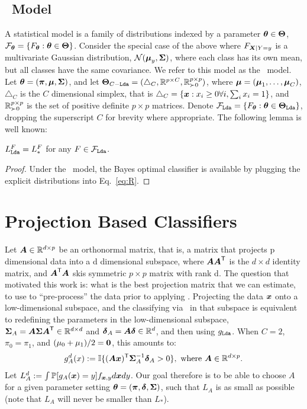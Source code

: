 \documentclass[10pt]{article}
\begin{document}
\subsection{\Lda~Model}

A statistical model is  a family of distributions indexed by a parameter $\boldsymbol{\theta} \in \boldsymbol{\Theta}$, $\mathcal{F}_{\boldsymbol{\theta}}=\{F_{\boldsymbol{\theta}} : \boldsymbol{\theta} \in \boldsymbol{\Theta} \}$.
Consider the special case of the above where $F_{\boldsymbol{X}|Y=y}$ is a multivariate Gaussian distribution,
$\mathcal{N}(\boldsymbol{\mu}_y,\boldsymbol{\Sigma})$, where each class has its own mean, but all classes have the same covariance.
We refer to this model as the \Lda~model.
Let $\boldsymbol{\theta}=(\boldsymbol{\pi},\boldsymbol{\mu},\boldsymbol{\Sigma})$, and let $\boldsymbol{\Theta}_{C-{\sc \texttt{Lda}}}=( \triangle_C, \mathbb{R}^{p \times C},\mathbb{R}_{\succ 0}^{p \times p})$, where $\boldsymbol{\mu}=(\boldsymbol{\mu}_1,\ldots, \boldsymbol{\mu}_C)$, $\triangle_C$ is the $C$ dimensional simplex, that is $\triangle_C = \{ \boldsymbol{x} : x_i \geq 0 \forall i, \sum_i x_i = 1\}$, and $\mathbb{R}_{\succ 0}^{p \times p}$ is the set of positive definite  $p \times p$ matrices. Denote
$\mathcal{F}_{{\sc \texttt{Lda}}}=\{F_{\boldsymbol{\theta}} : \boldsymbol{\theta} \in \boldsymbol{\Theta}_{{\sc \texttt{Lda}}}\}$, dropping the superscript $C$ for brevity where appropriate.
The following lemma is well known:
\begin{lem}
$L_{{\sc \texttt{Lda}}}^F=L_*^F$ for any $F \in \mathcal{F}_{{\sc \texttt{Lda}}}$.
\end{lem}

\begin{proof}
Under the \Lda~model, the Bayes optimal classifier is available by plugging the explicit distributions into Eq.~\eqref{eq:R}.
\end{proof}




\section[projections]{Projection Based Classifiers}


Let $\boldsymbol{A} \in \mathbb{R}^{d \times p}$ be an orthonormal matrix, that is, a matrix that projects p dimensional data into a d dimensional subspace, where $\boldsymbol{A}\boldsymbol{A}^{\mathsf{T}}$ is the $d \times d$ identity matrix, and $\boldsymbol{A}^{\mathsf{T}} \boldsymbol{A}$ skis symmetric $p \times p$ matrix with rank d.   The question that motivated this work is: what is the best projection matrix that we can estimate, to use to ``pre-process'' the data prior to applying \Lda.
Projecting the data $\boldsymbol{x}$ onto a low-dimensional subspace, and the classifying via \Lda~in that subspace is equivalent to redefining the parameters in the low-dimensional subspace,
$\boldsymbol{\Sigma}_A=\boldsymbol{A} \boldsymbol{\Sigma} \boldsymbol{A}^{\mathsf{T}} \in \mathbb{R}^{d \times d}$ and $\boldsymbol{\delta}_A = \boldsymbol{A} \boldsymbol{\delta} \in \mathbb{R}^d$, and then using $g_{{\sc \texttt{Lda}}}$.  When $C=2$, $\pi_0=\pi_1$, and $(\mu_0+\mu_1)/2=\boldsymbol{0}$, this amounts to:
\begin{align} \label{eq:g_A}
g^d_A(x) := \mathbb{I} \{ (\boldsymbol{A} \boldsymbol{x})^{\mathsf{T}} \boldsymbol{\Sigma}^{-1}_A \boldsymbol{\delta}_A > 0\}, \text{ where } \boldsymbol{A} \in \mathbb{R}^{d \times p}.
\end{align}
Let $L^d_A :=\int \mathbb{P}[g_A(\boldsymbol{x})=y] f_{\boldsymbol{x},y} d\boldsymbol{x} dy$.
Our goal therefore is to be able to choose $A$ for a given parameter setting $\boldsymbol{\theta}=(\boldsymbol{\pi}, \boldsymbol{\delta},\boldsymbol{\Sigma})$, such that $L_A$ is as small as possible (note that $L_A$ will never be smaller than $L_*$).
\end{document}
